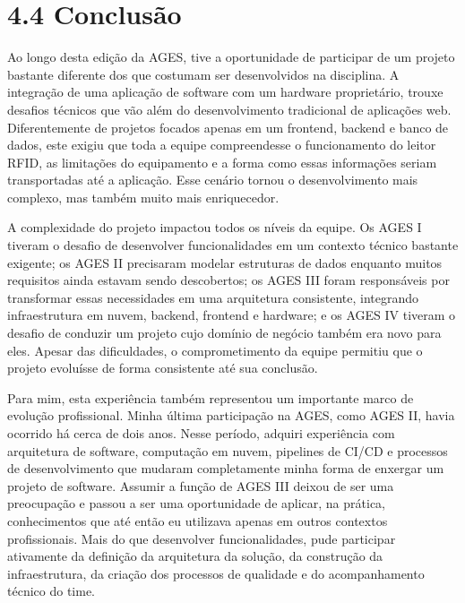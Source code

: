 \hypertarget{__RefHeading___Toc4825_3118176633}{}
\section*{4.4 Conclusão}
\label{ages-iii:text-h-0097}
\indent \originaltab{}Ao longo desta edição da AGES, tive a oportunidade de participar de um projeto bastante diferente dos que costumam ser desenvolvidos na disciplina. A integração de uma aplicação de software com um hardware proprietário, trouxe desafios técnicos que vão além do desenvolvimento tradicional de aplicações web. Diferentemente de projetos focados apenas em um frontend, backend e banco de dados, este exigiu que toda a equipe compreendesse o funcionamento do leitor RFID, as limitações do equipamento e a forma como essas informações seriam transportadas até a aplicação. Esse cenário tornou o desenvolvimento mais complexo, mas também muito mais enriquecedor.\par

\indent A complexidade do projeto impactou todos os níveis da equipe. Os AGES I tiveram o desafio de desenvolver funcionalidades em um contexto técnico bastante exigente; os AGES II precisaram modelar estruturas de dados enquanto muitos requisitos ainda estavam sendo descobertos; os AGES III foram responsáveis por transformar essas necessidades em uma arquitetura consistente, integrando infraestrutura em nuvem, backend, frontend e hardware; e os AGES IV tiveram o desafio de conduzir um projeto cujo domínio de negócio também era novo para eles. Apesar das dificuldades, o comprometimento da equipe permitiu que o projeto evoluísse de forma consistente até sua conclusão.\par

\indent Para mim, esta experiência também representou um importante marco de evolução profissional. Minha última participação na AGES, como AGES II, havia ocorrido há cerca de dois anos. Nesse período, adquiri experiência com arquitetura de software, computação em nuvem, pipelines de CI/CD e processos de desenvolvimento que mudaram completamente minha forma de enxergar um projeto de software. Assumir a função de AGES III deixou de ser uma preocupação e passou a ser uma oportunidade de aplicar, na prática, conhecimentos que até então eu utilizava apenas em outros contextos profissionais. Mais do que desenvolver funcionalidades, pude participar ativamente da definição da arquitetura da solução, da construção da infraestrutura, da criação dos processos de qualidade e do acompanhamento técnico do time.\par

